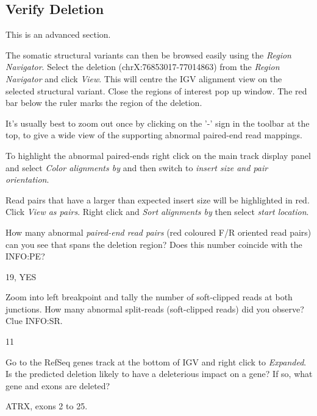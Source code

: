 \subsection{Verify Deletion}

\begin{advanced}
This is an advanced section.
\begin{steps}
The somatic structural variants can then be browsed easily using the \emph{Region Navigator}. 
Select the deletion (chrX:76853017-77014863) from the \emph{Region Navigator} and click \emph{View}. This will centre the IGV alignment view on the selected structural variant. Close the regions of interest pop up window. The red bar below the ruler marks the region of the deletion.

It's usually best to zoom out once by clicking on the '-' sign in the toolbar at the top, to give a wide view of the supporting abnormal paired-end read mappings. 

To highlight the abnormal paired-ends right click on the main track display panel and select \emph{Color alignments by} and then switch to \emph{insert size and pair orientation}.

Read pairs that have a larger than expected insert size will be highlighted in red. Click \emph{View as pairs}. Right click and \emph{Sort alignments by} then select \emph{start location}.

\end{steps}
\end{advanced}


\begin{questions}
How many abnormal \emph{paired-end read pairs} (red coloured F/R oriented read pairs) can you see that spans the deletion region? Does this number coincide with the INFO:PE? 
\begin{answer}
19, YES
\end{answer}
\end{questions}
\begin{questions}
Zoom into left breakpoint and tally the number of soft-clipped reads at both junctions.
How many abnormal split-reads (soft-clipped reads) did you observe? Clue INFO:SR.
\begin{answer}
11
\end{answer}
\end{questions}

\begin{questions}
Go to the RefSeq genes track at the bottom of IGV and right click to \emph{Expanded}.
Is the predicted deletion likely to have a deleterious impact on a gene? If so, what gene and exons are deleted?
\begin{answer}
ATRX, exons 2 to 25.
\end{answer}
\end{questions}

